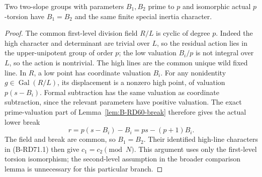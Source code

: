 \begin{lemma}
\label{lem:B-RD71-first-level}
Two two-slope groups with parameters \(B_1,B_2\) prime to \(p\)
and isomorphic actual \(p\)-torsion have \(B_1=B_2\) and the
same finite special inertia character.
\end{lemma}
\begin{proof}
The common first-level division field \(R/L\) is cyclic of
degree \(p\). Indeed the high character and determinant are
trivial over \(L\), so the residual action lies in the
upper-unipotent group of order \(p\); the low valuation \(B_i/p\)
is not integral over \(L\), so the action is nontrivial.
The high lines are the common unique wild fixed line.
In \(R\), a low point has coordinate valuation \(B_i\).
For any nonidentity \(g\in\operatorname{Gal}(R/L)\), its
displacement is a nonzero high point, of valuation
\(p(s-B_i)\). Formal subtraction has the same valuation as
coordinate subtraction, since the relevant parameters have
positive valuation.
The exact prime-valuation part of
Lemma~\ref{lem:B-RD60-break} therefore gives the actual lower break
\[
 r=p(s-B_i)-B_i=ps-(p+1)B_i.
 \tag{B-RD71.2}
\]
The field and break are common, so \(B_1=B_2\).
Their identified high-line characters in (B-RD71.1) then
give \(c_1=c_2\pmod N\). This argument uses only the first-level
torsion isomorphism; the second-level assumption in the broader
comparison lemma is unnecessary for this particular branch.
\end{proof}

